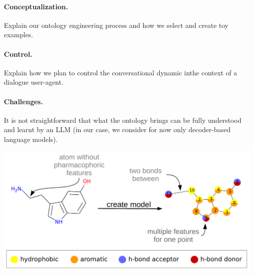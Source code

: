 \documentclass[a0paper,portrait]{baposter}
\begin{document}
\begin{poster}
{\paragraph*{Conceptualization.} Explain our ontology engineering process and how we select and create toy examples.\\
\paragraph*{Control.} Explain how we plan to control the conversational dynamic inthe context of a dialogue user-agent.\\
\paragraph*{Challenges.} It is not straightforward that what the ontology brings can be fully understood and learnt by an LLM (in our case, we consider for now only decoder-based language models). 

\begin{center}
    \includegraphics[width=\linewidth]{phar}
\end{center}
}

\end{poster}
\end{document}
